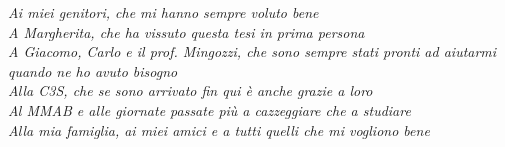 
\begin{flushright}
	\begin{minipage}{0.5\columnwidth}
		\begin{flushright}
			\textit{Ai miei genitori, che mi hanno sempre voluto bene}
			\\[1\baselineskip]
			\textit{A Margherita, che ha vissuto questa tesi in prima persona}
			\\[1\baselineskip]
			\textit{A Giacomo, Carlo e il prof. Mingozzi, che sono sempre stati pronti ad aiutarmi quando ne ho avuto bisogno}
			\\[1\baselineskip]
			\textit{Alla C3S, che se sono arrivato fin qui è anche grazie a loro}
			\\[1\baselineskip]
			\textit{Al MMAB e alle giornate passate più a cazzeggiare che a studiare}
			\\[1\baselineskip]
			\textit{Alla mia famiglia, ai miei amici e a tutti quelli che mi vogliono bene}
		\end{flushright}
	\end{minipage}
\end{flushright}



